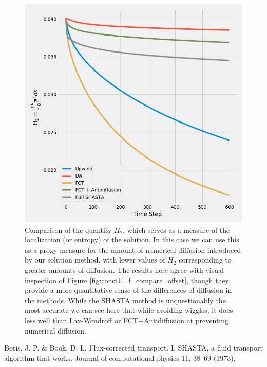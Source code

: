 \documentclass[]{article}
\begin{document}
\begin{figure}

		\centering
		\includegraphics[width=.8\linewidth]{figures/constU_compareH.png}
		\caption{Comparison of the quantity $H_2$, which serves as a measure of the localization (or entropy) of the solution. In this case we can use this as a proxy measure for the amount of numerical diffusion introduced by our solution method, with lower values of $H_2$ corresponding to greater amounts of diffusion. The results here agree with visual inspection of Figure \ref{fig:constU_f_compare_offset}, though they provide a more quantitative sense of the differences of diffusion in the methods. While the SHASTA method is unquestionably the most accurate we can see here that while avoiding wiggles, it does less well than Lax-Wendroff or FCT+Antidiffusion at preventing numerical diffusion.}
	\label{fig:constU_compareH}
\end{figure}

  \begin{thebibliography}{1}
  	
  	 Boris, J. P. \& Book, D. L. Flux-corrected transport. I. SHASTA, a fluid transport algorithm that works. Journal of computational physics 11, 38–69 (1973).
  	

  \end{thebibliography}
\end{document}
